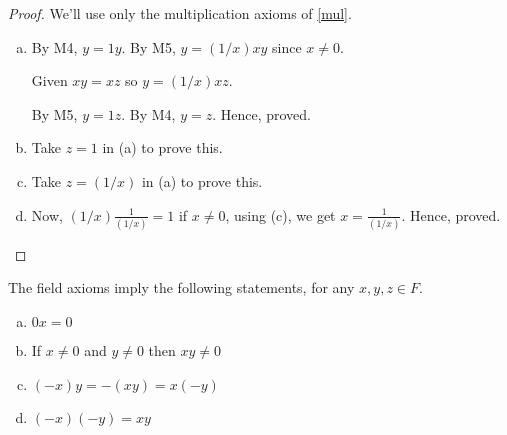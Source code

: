 \begin{proof}
    We'll use only the multiplication axioms of \ref{mul}.
    \begin{enumerate}[a)]
        \item 
            By M4, $y = 1y$.         
            By M5, $y = (1/x) x y$ since $x \neq 0$. 

            Given $xy = xz$ so $y = (1/x) x z$.

            By M5, $y = 1z$. By M4, $y = z$. Hence, proved. 
        
        \item Take $z = 1$ in (a) to prove this.
        \item Take $z = (1/x)$ in (a) to prove this.
        \item Now, $(1/x) \frac{1}{(1/x)} = 1$ if $x \neq 0$, using (c), 
        we get $x = \frac{1}{(1/x)}$. Hence, proved.
    \end{enumerate}
\end{proof}


\begin{prop}
    \label{disprop}
    The field axioms imply the following statements, for any $x, y, z \in F$.
    \begin{enumerate}[a)]
        \item $0x = 0$
        \item If $x \neq 0$ and $y \neq 0$ then $xy \neq 0$
        \item $(-x)y = -(xy) = x(-y)$
        \item $(-x)(-y) = xy$
    \end{enumerate}
\end{prop}

